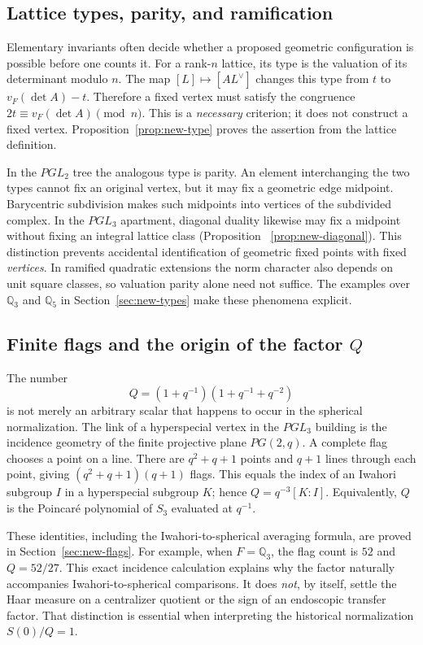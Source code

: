 \documentclass[12pt,letterpaper]{amsart}
\numberwithin{equation}{section}
\theoremstyle{definition}
\theoremstyle{plain}
\begin{document}
\subsection{Lattice types, parity, and ramification}
\label{sec:intro-parity}

Elementary invariants often decide whether a proposed geometric
configuration is possible before one counts it. For a rank-$n$
lattice, its type is the valuation of its determinant modulo $n$.
The map $[L]\mapsto[AL^\vee]$ changes this type from $t$ to
$v_F(\det A)-t$. Therefore a fixed vertex must satisfy the
congruence $2t\equiv v_F(\det A)\pmod n$.
This is a \emph{necessary} criterion; it does not construct a fixed
vertex. Proposition~\ref{prop:new-type} proves the assertion
from the lattice definition.

In the $PGL_2$ tree the analogous type is parity. An element
interchanging the two types cannot fix an original vertex, but it
may fix a geometric edge midpoint. Barycentric subdivision makes
such midpoints into vertices of the subdivided complex. In the
$PGL_3$ apartment, diagonal duality likewise may fix a midpoint
without fixing an integral lattice class (Proposition~
\ref{prop:new-diagonal}). This distinction prevents accidental
identification of geometric fixed points with fixed \emph{vertices}.
In ramified quadratic extensions the norm character also depends
on unit square classes, so valuation parity alone need not suffice.
The examples over $\mathbb Q_3$ and $\mathbb Q_5$ in
Section~\ref{sec:new-types} make these phenomena explicit.

\subsection{Finite flags and the origin of the factor $Q$}
\label{sec:intro-flags}

The number
\[
 Q=(1+q^{-1})(1+q^{-1}+q^{-2})
\]
is not merely an arbitrary scalar that happens to occur in the
spherical normalization. The link of a hyperspecial vertex in the
$PGL_3$ building is the incidence geometry of the finite
projective plane $PG(2,q)$. A complete flag chooses a point on a
line. There are $q^2+q+1$ points and $q+1$ lines through each
point, giving $(q^2+q+1)(q+1)$ flags. This equals the index of an
Iwahori subgroup $I$ in a hyperspecial subgroup $K$; hence
$Q=q^{-3}[K:I]$. Equivalently, $Q$ is the Poincar\'e polynomial
of $S_3$ evaluated at $q^{-1}$.

These identities, including the Iwahori-to-spherical averaging
formula, are proved in Section~\ref{sec:new-flags}. For example,
when $F=\mathbb Q_3$, the flag count is $52$ and
$Q=52/27$. This exact incidence calculation explains why the
factor naturally accompanies Iwahori-to-spherical comparisons.
It does \emph{not}, by itself, settle the Haar measure on a
centralizer quotient or the sign of an endoscopic transfer factor.
That distinction is essential when interpreting the historical
normalization $S(0)/Q=1$.
\end{document}
